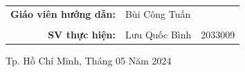 \begin{titlepage}
\begin{center}
\begin{tabular}{c}
            \\
            \hline
        \end{tabular}
    \end{center}

    \vspace{0.7cm}

    \begin{table}[h]
        \centering \large
        \begin{tabular}{rll}
            \textbf{Giáo viên hướng dẫn:} & Bùi Công Tuấn &         \\
            &               &         \\
            \textbf{SV thực hiện:}        & Lưu Quốc Bình & 2033009 \\
        \end{tabular}\label{tab:table}
    \end{table}

    \vspace{1.0cm}
    \begin{center}
    {\footnotesize Tp. Hồ Chí Minh, Tháng 05 Năm 2024}
    \end{center}
\end{titlepage}
